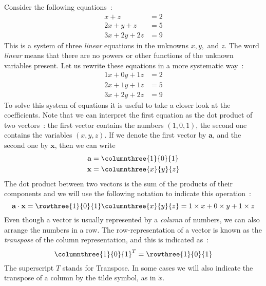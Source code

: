 Consider the following equations~:
\begin{align}
x+z&=2\nonumber\\
2x+y+z&=5\\
3x+2y+2z&=9\nonumber
\end{align}
This is a system of three \textit{linear} equations in the unknowns $x,y,$ and $z$.  The word \textit{linear} means that
there are no powers or other functions of the unknown variables present. 
Let us rewrite these equations in a more systematic way~:
\begin{align}
1x+0y+1z&=2\nonumber\\
2x+1y+1z&=5\\
3x+2y+2z&=9\nonumber
\end{align}
To solve this system of equations it is useful to take a closer look at the coefficients.  
Note that we can interpret the first equation as the dot product of two vectors~:
the first vector contains the numbers $(1,0,1)$, the second one contains the variables $(x,y,z)$.
If we denote the first vector by $\mathbf{a}$, and the second one by $\mathbf{x}$, then we can write
\begin{align}
\mathbf{a}&=\columnthree{1}{0}{1}\nonumber\\
\mathbf{x}&=\columnthree{x}{y}{z}\nonumber
\end{align}
The dot product between two vectors is the sum of the products of their components and we will use the 
following notation to indicate this operation~:
\begin{equation}
\mathbf{a}\cdot\mathbf{x}=\rowthree{1}{0}{1}\columnthree{x}{y}{z}=1\times x+0\times y+1\times z
\end{equation}
Even though a vector is usually represented by a \textit{column} of numbers, we can also arrange the numbers in a row.
The row-representation of a vector is known as the \textit{transpose} of the column representation, and this is indicated as~:
\begin{equation}
\columnthree{1}{0}{1}^{T}=\rowthree{1}{0}{1}
\end{equation}
The superscript $T$ stands for Transpose.  In some cases we will also indicate the transpose of a column by the tilde symbol,
as in $\tilde{x}$.

